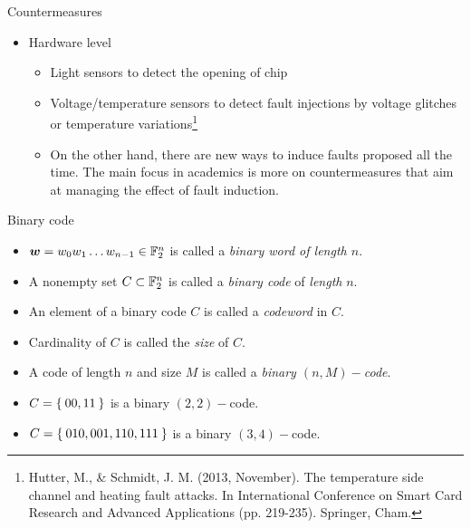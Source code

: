 \begin{frame}{Countermeasures}
    \begin{itemize}
        \item Hardware level
        \begin{itemize}
            \item Light sensors to detect the opening of chip
            \item Voltage/temperature sensors to detect fault injections by voltage glitches or temperature variations\footnote{Hutter, M., \& Schmidt, J. M. (2013, November). The temperature side channel and heating fault attacks. In International Conference on Smart Card Research and Advanced Applications (pp. 219-235). Springer, Cham.}
            \item On the other hand, there are new ways to induce faults proposed all the time. The main focus in academics is more on countermeasures that aim at managing the effect of fault induction.
        \end{itemize}
    \end{itemize}
\end{frame}


\begin{frame}{Binary code}
    \begin{definition}
\begin{itemize}
        \item $\boldsymbol{w}=w_0w_1\dots w_{n-1}\in{\mathbb F}_2^n$ is called a \textit{binary word of length $n$}.
        \item A nonempty set $C\subset{\mathbb F}_2^n$ is called a \textit{binary code} of \textit{length} $n$.
        \item An element of a binary code $C$ is called a \textit{codeword} in $C$.
        \item Cardinality of $C$ is called the \textit{size} of $C$.
        \item A code of length $n$ and size $M$ is called a \textit{binary $(n,M)-$code}.
\end{itemize}
\end{definition}
\begin{example}
    \begin{itemize}
        \item $C=\Set{00,11}$ is a binary $(2,2)-$code.
        \item $C=\Set{010,001,110,111}$ is a binary $(3,4)-$code.
    \end{itemize}
\end{example}
\end{frame}


